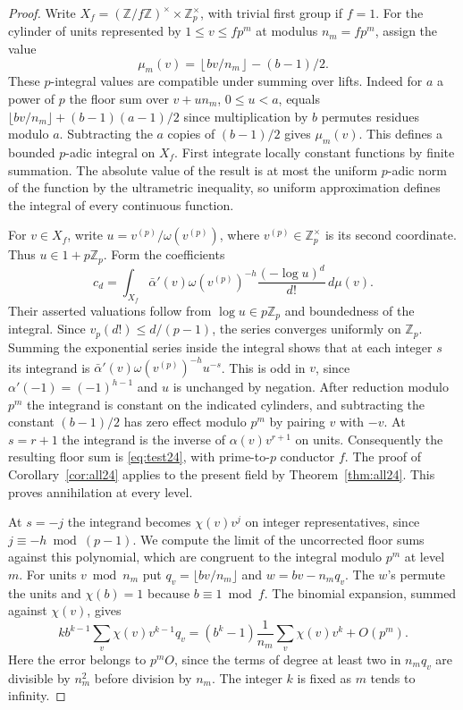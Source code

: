 \documentclass[a4paper,11pt]{article}
\theoremstyle{definition}
\theoremstyle{remark}
\newcommand{\ZZ}{\mathbb Z}\newcommand{\ord}{\operatorname{ord}}
\numberwithin{equation}{section}
\begin{document}
\begin{proof}
Write \(X_f=(\ZZ/f\ZZ)^\times\times\ZZ_p^\times\), with
trivial first group if \(f=1\). For the cylinder of units
represented by \(1\le v\le fp^m\) at modulus \(n_m=fp^m\),
assign the value
\[
       \mu_m(v)=\left\lfloor bv/n_m\right\rfloor-(b-1)/2.
\]
These \(p\)-integral values are compatible under summing over
lifts. Indeed for \(a\) a power of \(p\) the floor sum over
\(v+un_m\), \(0\le u<a\), equals
\(\lfloor bv/n_m\rfloor+(b-1)(a-1)/2\) since multiplication
by \(b\) permutes residues modulo \(a\). Subtracting the
\(a\) copies of \((b-1)/2\) gives \(\mu_m(v)\).
This defines a bounded \(p\)-adic integral on \(X_f\). First integrate
locally constant functions by finite summation. The absolute
value of the result is at most the uniform \(p\)-adic norm
of the function by the ultrametric inequality, so uniform
approximation defines the integral of every continuous function.

For \(v\in X_f\), write \(u=v^{(p)}/\omega(v^{(p)})\),
where \(v^{(p)}\in\ZZ_p^\times\) is its second coordinate.
Thus \(u\in1+p\ZZ_p\). Form the coefficients
\[
       c_d=\int_{X_f}\bar\alpha'(v)\omega(v^{(p)})^{-h}
                        \frac{(-\log u)^d}{d!}\,d\mu(v).
\]
Their asserted valuations follow from \(\log u\in p\ZZ_p\)
and boundedness of the integral. Since \(v_p(d!)\le d/(p-1)\),
the series converges uniformly on \(\ZZ_p\). Summing the
exponential series inside the integral shows that at each
integer \(s\) its integrand is
\(\bar\alpha'(v)\omega(v^{(p)})^{-h}u^{-s}\).
This is odd in \(v\), since \(\alpha'(-1)=(-1)^{h-1}\)
and \(u\) is unchanged by negation. After reduction modulo
\(p^m\) the integrand is constant on the indicated cylinders, and subtracting
the constant \((b-1)/2\) has zero effect modulo \(p^m\) by
pairing \(v\) with \(-v\). At \(s=r+1\) the integrand is
the inverse of \(\alpha(v)v^{r+1}\) on units. Consequently
the resulting floor sum is \eqref{eq:test24}, with prime-to-\(p\)
conductor \(f\). The proof of Corollary~\ref{cor:all24} applies
to the present field by Theorem~\ref{thm:all24}. This proves
annihilation at every level.

At \(s=-j\) the integrand becomes \(\chi(v)v^j\) on integer
representatives, since \(j\equiv-h\bmod(p-1)\).
We compute the limit of the uncorrected floor sums against
this polynomial, which are congruent to the integral modulo
\(p^m\) at level \(m\). For units \(v\bmod n_m\) put
\(q_v=\lfloor bv/n_m\rfloor\) and \(w=bv-n_m q_v\).
The \(w\)'s permute the units and \(\chi(b)=1\) because
\(b\equiv1\bmod f\). The binomial expansion, summed against
\(\chi(v)\), gives
\[
 k b^{k-1}\sum_v\chi(v)v^{k-1}q_v
    =(b^k-1)\frac1{n_m}\sum_v\chi(v)v^k+O(p^m).
\]
Here the error belongs to \(p^m O\), since the terms of degree
at least two in \(n_m q_v\) are divisible by \(n_m^2\) before
division by \(n_m\). The integer \(k\) is fixed as \(m\) tends
to infinity.


\end{proof}
\end{document}
